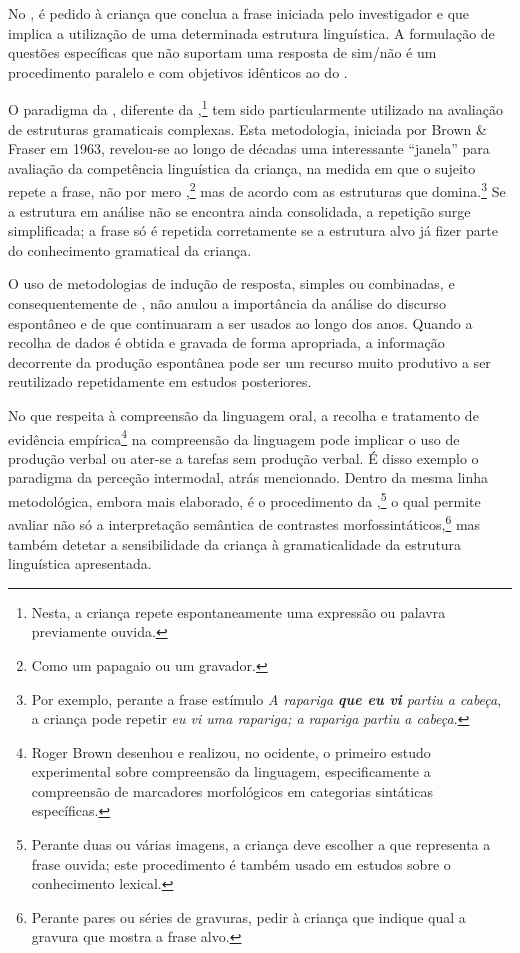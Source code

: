 \documentclass[output=paper]{LSP/langsci}
\begin{document}
No , é pedido à criança que conclua a frase iniciada pelo investigador e que implica a utilização de uma determinada estrutura linguística. A formulação de questões específicas que não suportam uma resposta de sim/não é um procedimento paralelo e com objetivos idênticos ao do . 

O paradigma da , diferente da ,\footnote{Nesta, a criança repete espontaneamente uma expressão ou palavra previamente ouvida.} tem sido particularmente utilizado na avaliação de estruturas gramaticais complexas. Esta metodologia, iniciada por Brown \& Fraser em 1963, revelou-se ao longo de décadas uma interessante ``janela” para avaliação da competência linguística da criança, na medida em que o sujeito repete a frase, não por mero ,\footnote{Como um papagaio ou um gravador.} mas de acordo com as estruturas que domina.\footnote{Por exemplo, perante a frase estímulo \emph{A rapariga \textbf{que eu vi} partiu a cabeça}, a criança pode repetir \emph{eu vi uma rapariga; a rapariga partiu a cabeça}.} Se a estrutura em análise não se encontra ainda consolidada, a repetição surge simplificada; a frase só é repetida corretamente se a estrutura alvo já fizer parte do conhecimento gramatical da criança.

O uso de metodologias de indução de resposta, simples ou combinadas, e consequentemente de , não anulou a importância da análise do discurso espontâneo e de  que continuaram a ser usados ao longo dos anos. Quando a recolha de dados é obtida e gravada de forma apropriada, a informação decorrente da produção espontânea pode ser um recurso muito produtivo a ser reutilizado repetidamente em estudos posteriores.

No que respeita à compreensão da linguagem oral, a recolha e tratamento de evidência empírica\footnote{Roger Brown \citeyearpar{brown1957} desenhou e realizou, no ocidente, o primeiro estudo experimental sobre compreensão da linguagem, especificamente a compreensão de marcadores morfológicos em categorias sintáticas específicas.} na compreensão da linguagem pode implicar o uso de produção verbal ou ater-se a tarefas sem produção verbal. É disso exemplo o paradigma da perceção intermodal, atrás mencionado. Dentro da mesma linha metodológica, embora mais elaborado, é o procedimento da ,\footnote{Perante duas ou várias imagens, a criança deve escolher a que representa a frase ouvida; este procedimento é também usado em estudos sobre o conhecimento lexical.} o qual permite avaliar não só a interpretação semântica de contrastes morfossintáticos,\footnote{Perante pares ou séries de gravuras, pedir à criança que indique qual a gravura que mostra a frase alvo.} mas também detetar a sensibilidade da criança à gramaticalidade da estrutura linguística apresentada.
\end{document}

